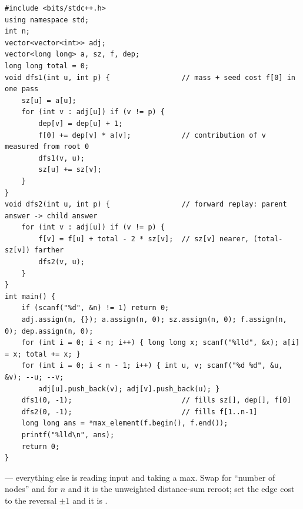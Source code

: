 \begin{lstlisting}[caption={Tree with Maximum Cost -- one subtree-mass DFS + one forward reroot replay f[v]=f[u]+S-2*sz[v]; long long throughout (Codeforces 1092F; O(n))}, label={lst:c09-summit}]
#include <bits/stdc++.h>
using namespace std;
int n;
vector<vector<int>> adj;
vector<long long> a, sz, f, dep;
long long total = 0;
void dfs1(int u, int p) {                 // mass + seed cost f[0] in one pass
    sz[u] = a[u];
    for (int v : adj[u]) if (v != p) {
        dep[v] = dep[u] + 1;
        f[0] += dep[v] * a[v];            // contribution of v measured from root 0
        dfs1(v, u);
        sz[u] += sz[v];
    }
}
void dfs2(int u, int p) {                 // forward replay: parent answer -> child answer
    for (int v : adj[u]) if (v != p) {
        f[v] = f[u] + total - 2 * sz[v];  // sz[v] nearer, (total-sz[v]) farther
        dfs2(v, u);
    }
}
int main() {
    if (scanf("%d", &n) != 1) return 0;
    adj.assign(n, {}); a.assign(n, 0); sz.assign(n, 0); f.assign(n, 0); dep.assign(n, 0);
    for (int i = 0; i < n; i++) { long long x; scanf("%lld", &x); a[i] = x; total += x; }
    for (int i = 0; i < n - 1; i++) { int u, v; scanf("%d %d", &u, &v); --u; --v;
        adj[u].push_back(v); adj[v].push_back(u); }
    dfs1(0, -1);                          // fills sz[], dep[], f[0]
    dfs2(0, -1);                          // fills f[1..n-1]
    long long ans = *max_element(f.begin(), f.end());
    printf("%lld\n", ans);
    return 0;
}
\end{lstlisting}
\begin{notebox}
 --- everything else is reading input and taking a max.
Swap  for ``number of nodes'' and  for $n$ and it is the unweighted
distance-sum reroot; set the edge cost to the reversal $\pm1$ and it is .
\end{notebox}

